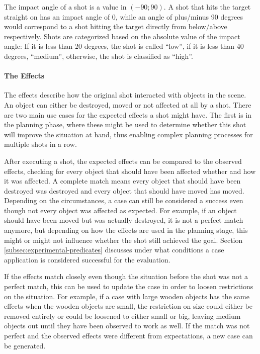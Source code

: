 The impact angle of a shot is a value in $(-90;90)$. A shot that hits the target straight on has an impact angle of 0, while an angle of plus/minus 90 degrees would correspond to a shot hitting the target directly from below/above respectively. Shots are categorized based on the absolute value of the impact angle: If it is less than 20 degrees, the shot is called ``low'', if it is less than 40 degrees, ``medium'', otherwise, the shot is classified as ``high''.



\paragraph{The Effects}
The effects describe how the original shot interacted with objects in the scene. 
An object can either be destroyed, moved or not affected at all by a shot. There are two main use cases for the expected effects a shot might have.
The first is in the planning phase, where these might be used to determine whether this shot will improve the situation at hand, thus enabling complex planning processes for multiple shots in a row.

After executing a shot, the expected effects can be compared to the observed effects, checking for every object that should have been affected whether and how it was affected.
A complete match means every object that should have been destroyed was destroyed and every object that should have moved has moved.
Depending on the circumstances, a case can still be considered a success even though not every object was affected as expected.
For example, if an object should have been moved but was actually destroyed, it is not a perfect match anymore, but depending on how the effects are used in the planning stage, this might or might not influence whether the shot still achieved the goal. Section \ref{subsec:experimental-predicates} discusses under what conditions a case application is considered successful for the evaluation.

If the effects match closely even though the situation before the shot was not a perfect match, this can be used to update the case in order to loosen restrictions on the situation. 
For example, if a case with large wooden objects has the same effects when the wooden objects are small, the restriction on size could either be removed entirely or could be loosened to either small or big, leaving medium objects out until they have been observed to work as well.
If the match was not perfect and the observed effects were different from expectations, a new case can be generated.

